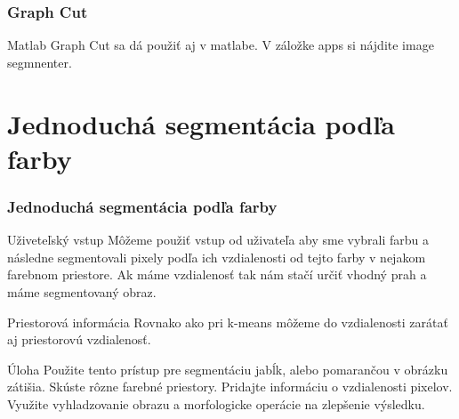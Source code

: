 \documentclass{beamer}
\begin{document}
\begin{frame}
\frametitle{Graph Cut}
\begin{block}{Matlab}
Graph Cut sa dá použiť aj v matlabe. V záložke apps si nájdite image segmnenter.
\end{block}
\end{frame}


\section{Jednoduchá segmentácia podľa farby}

\begin{frame}
\frametitle{Jednoduchá segmentácia podľa farby}
\begin{block}{Uživeteľský vstup}
Môžeme použiť vstup od uživateľa aby sme vybrali farbu a následne segmentovali pixely podľa ich vzdialenosti od tejto farby v nejakom farebnom priestore. Ak máme vzdialenosť tak nám stačí určiť vhodný prah a máme segmentovaný obraz.\end{block}

\begin{block}{Priestorová informácia}
Rovnako ako pri k-means môžeme do vzdialenosti zarátať aj priestorovú vzdialenosť.
\end{block}

\begin{block}{Úloha}
Použite tento prístup pre segmentáciu jabĺk, alebo pomarančou v obrázku zátišia. Skúste rôzne farebné priestory. Pridajte informáciu o vzdialenosti pixelov. Využite vyhladzovanie obrazu a morfologicke operácie na zlepšenie výsledku.
\end{block}
\end{frame}
\end{document}
